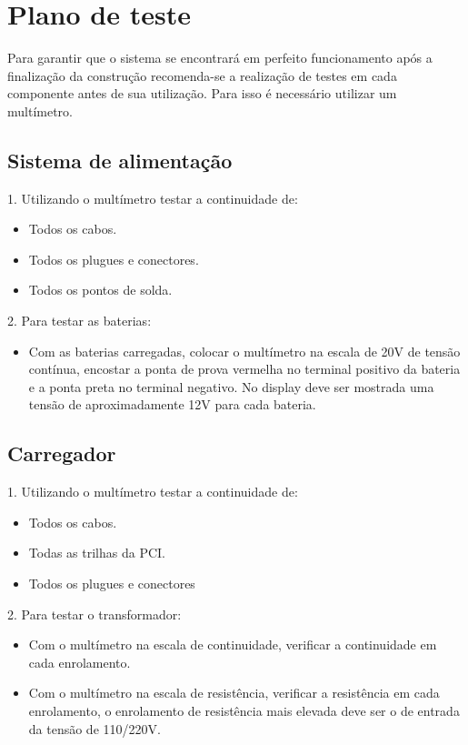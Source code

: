 \chapter{Plano de teste}

Para garantir que o sistema se encontrará em perfeito funcionamento após a finalização da construção recomenda-se a realização de testes em cada componente antes de sua utilização. Para isso é necessário utilizar um multímetro.

\section{Sistema de alimentação}

1. Utilizando o multímetro testar a continuidade de:

\begin{itemize}
    \item Todos os cabos.
    \item Todos os plugues e conectores.
    \item Todos os pontos de solda.
\end{itemize}
		
2. Para testar as baterias:

\begin{itemize}
    \item Com as baterias carregadas, colocar o multímetro na escala de 20V de tensão contínua, encostar a ponta de prova vermelha no terminal positivo da bateria e a ponta preta no terminal negativo. No display deve ser mostrada uma tensão de aproximadamente 12V para cada bateria.
\end{itemize}

\section{Carregador}

1. Utilizando o multímetro testar a continuidade de:

\begin{itemize}
    \item Todos os cabos.
    \item Todas as trilhas da PCI.
    \item Todos os plugues e conectores

\end{itemize}

2. Para testar o transformador:

\begin{itemize}
    \item Com o multímetro na escala de continuidade, verificar a continuidade em cada enrolamento.
    \item Com o multímetro na escala de resistência, verificar a resistência em cada enrolamento, o enrolamento de resistência mais elevada deve ser o de entrada da tensão de 110/220V.
 
\end{itemize}

